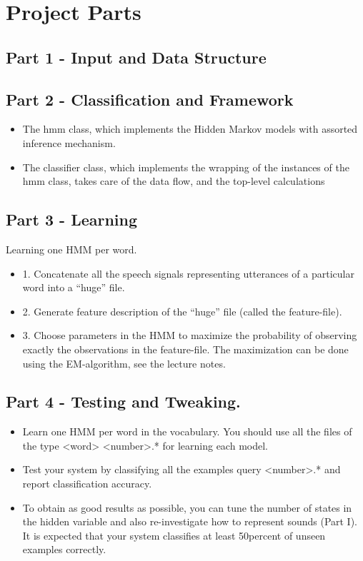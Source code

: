 \documentclass[titlepage]{article}
\begin{document}
\section{Project Parts}
	\subsection{Part 1 - Input and Data Structure}

	\subsection{Part 2 - Classification and Framework}
\begin{itemize}
\item The hmm class, which implements the Hidden Markov models with assorted inference mechanism.
\item The classifier class, which implements the wrapping of the instances of the hmm class, takes care of the data ﬂow, and the top-level calculations
\end{itemize}	

    \subsection{Part 3 - Learning}
Learning one HMM per word. 
\begin{itemize}
\item 1. Concatenate all the speech signals representing utterances of a particular word into a “huge” ﬁle.
\item 2. Generate feature description of the “huge” ﬁle (called the feature-ﬁle).
\item 3. Choose parameters in the HMM to maximize the probability of observing exactly the observations in the feature-ﬁle. The maximization can be done using the EM-algorithm, see the lecture notes.
\end{itemize}

    \subsection{Part 4 - Testing and Tweaking. }
\begin{itemize}
\item Learn one HMM per word in the vocabulary. You should use all the ﬁles of the type <word> <number>.* for learning each model.
\item Test your system by classifying all the examples query <number>.* and report classiﬁcation accuracy.
\item To obtain as good results as possible, you can tune the number of states in the hidden variable and also re-investigate how to represent sounds (Part I). It is expected that your system classiﬁes at least 50percent of unseen examples correctly.
\end{itemize}
\end{document}
